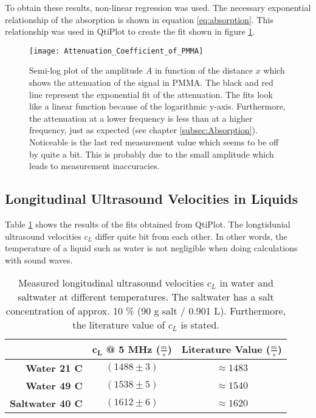 To obtain these results, non-linear regression was used. The necessary exponential relationship of the absorption is shown in equation \ref{eq:absorption}. This relationship was used in QtiPlot to create the fit shown in figure \ref{fig:Attenuation_Coefficient_of_PMMA}.

\begin{figure}[H]
	\centering
	\texttt{[image: Attenuation\_Coefficient\_of\_PMMA]}
	\caption{Semi-log plot of the amplitude $A$ in function of the distance $x$ which shows the attenuation of the signal in PMMA. The black and red line represent the exponential fit of the attenuation. The fits look like a linear function because of the logarithmic y-axis. Furthermore, the attenuation at a lower frequency is less than at a higher frequency, just as expected (see chapter \ref{subsec:Absorption}). Noticeable is the last red measurement value which seems to be off by quite a bit. This is probably due to the small amplitude which leads to measurement inaccuracies.}
	\label{fig:Attenuation_Coefficient_of_PMMA}
\end{figure}

\newpage
\subsection{Longitudinal Ultrasound Velocities in Liquids}
\label{subsec:Longitudinal_Ultrasound_Velocities_in_Liquids}
Table \ref{tab:Longitudinal_Ultrasound_Velocities_in_Liquids} shows the results of the fits obtained from QtiPlot. The longtidunial ultrasound velocities $c_L$ differ quite bit from each other. In other words, the temperature of a liquid such as water is not negligible when doing calculations with sound waves.

\begin{table}[H]
	\centering
	\renewcommand{\arraystretch}{1.3}
	\begin{tabular}{r||c|c}
		& $\boldsymbol{c_L}$ \textbf{@ 5 MHz} ($\frac{\si{m}}{\si{s}}$) & \textbf{Literature Value} ($\frac{\si{m}}{\si{s}}$) \cite{kohlrausch} \\
		\hline\hline
		\textbf{Water 21 \textdegree C} & $(1488\pm 3)$ & $\approx 1483$ \\
		\textbf{Water 49 \textdegree C} & $(1538\pm 5)$ & $\approx 1540$ \\
		\textbf{Saltwater 40 \textdegree C} & $(1612\pm 6)$ & $\approx 1620$ \\
	\end{tabular}
	\caption{Measured longitudinal ultrasound velocities $c_L$ in water and saltwater at different temperatures. The saltwater has a salt concentration of approx. 10 \% (90 g salt / 0.901 L). Furthermore, the literature value of $c_L$ is stated.}
	\label{tab:Longitudinal_Ultrasound_Velocities_in_Liquids}
\end{table}

